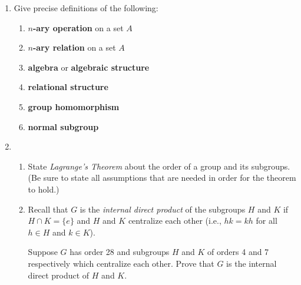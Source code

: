\documentclass[fleqn,12pt]{article}
\newcommand{\<}{\ensuremath{\langle}}
\renewcommand{\>}{\ensuremath{\rangle}}
\newcommand{\bA}{\ensuremath{\mathbf{A}}}
\newcommand{\bB}{\ensuremath{\mathbf{B}}}
\begin{document}
\newpage
\begin{enumerate}[{\bf 1.}]
\item Give precise definitions of the following:

  \begin{enumerate}
  \item {\bf $n$-ary operation} on a set $A$
    \vskip3cm

  \item {\bf $n$-ary relation} on a set $A$
    \vskip3cm


  \item {\bf algebra} or {\bf algebraic structure}
    \vskip3cm

  \item {\bf relational structure}
    \vskip3cm


  \item {\bf group homomorphism}
    \vskip3cm



  \item {\bf normal subgroup}
    
  \end{enumerate}

\newpage

\item
  \begin{enumerate}
  \item State \emph{Lagrange's Theorem} about the order of a group and its
    subgroups. (Be sure to state all assumptions that are needed in order for
    the theorem to hold.)  
\vskip7cm
    \item Recall that $G$ is the 
      \emph{internal direct product} of the subgroups $H$ and $K$ if 
      $H\cap K= \{e\}$ and $H$ and $K$ centralize each other (i.e., $hk = kh$ for
      all $h\in H$ and $k\in K$). 

      Suppose $G$ has order 28 and subgroups $H$ and $K$ of orders 4
      and 7 respectively which centralize each other.  Prove that
      $G$ is the internal direct product of $H$ and $K$.
  \end{enumerate}


\end{enumerate}
\end{document}
